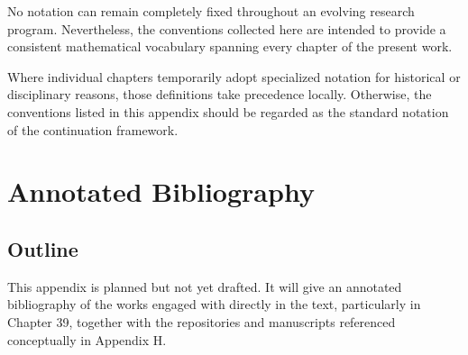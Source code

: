 \documentclass[11pt,oneside]{book}
\numberwithin{equation}{chapter}
\theoremstyle{definition}
\theoremstyle{plain}
\begin{document}
No notation can remain completely fixed throughout an evolving research
program. Nevertheless, the conventions collected here are intended to
provide a consistent mathematical vocabulary spanning every chapter of
the present work.

Where individual chapters temporarily adopt specialized notation for
historical or disciplinary reasons, those definitions take precedence
locally. Otherwise, the conventions listed in this appendix should be
regarded as the standard notation of the continuation framework.

\chapter{Annotated Bibliography}

\section{Outline}

This appendix is planned but not yet drafted. It will give an annotated
bibliography of the works engaged with directly in the text, particularly
in Chapter 39, together with the repositories and manuscripts referenced
conceptually in Appendix H.
\end{document}
